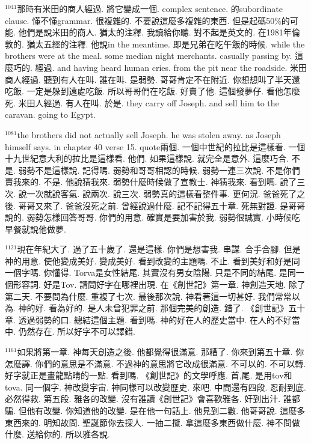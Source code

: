 \documentclass{book}
\begin{document}
$^{1041}$那時有米田的商人經過.
將它變成一個.
complex sentence.
的subordinate clause.
懂不懂grammar.
很複雜的.
不要說這麼多複雜的東西.
但是起碼50\%的可能.
他們是說米田的商人.
猶太的注釋.
我讀給你聽.
對不起是英文的.
在1981年倫敦的.
猶太五經的注釋.
他說in the meantime.
即是兄弟在吃午飯的時候.
while the brothers were at the meal.
some median night merchants.
casually passing by.
這麼巧的.
經過.
and having heard human cries.
from the pit near the roadside.
米田商人經過.
聽到有人在叫.
誰在叫.
是弱勢.
哥哥肯定不在附近.
你想想叫了半天還吃飯.
一定是躲到遠處吃飯.
所以哥哥們在吃飯.
好賣了他.
這個發夢仔.
看他怎麼死.
米田人經過.
有人在叫.
於是.
they carry off Joseph.
and sell him to the caravan.
going to Egypt.

$^{1081}$the brothers did not actually sell Joseph.
he was stolen away.
as Joseph himself says.
in chapter 40 verse 15.
quote兩個.
一個中世紀的拉比是這樣看.
一個十九世紀意大利的拉比是這樣看.
他們.
如果這樣說.
就完全是意外.
這麼巧合.
不是.
弱勢不是這樣說.
記得嗎.
弱勢和哥哥相認的時候.
弱勢一連三次說.
不是你們賣我來的.
不是.
他說猜我來.
弱勢什麼時候做了宣教士.
神猜我來.
看到嗎.
說了三次.
說一次就說客氣.
說兩次.
說三次.
弱勢真的這樣看整件事.
更何況.
爸爸死了之後.
哥哥又來了.
爸爸沒死之前.
曾經說過什麼.
記不記得五十章.
死無對證.
是哥哥說的.
弱勢怎樣回答哥哥.
你們的用意.
確實是要加害於我.
弱勢很誠實.
小時候吃早餐就說他做夢.

$^{1121}$現在年紀大了.
過了五十歲了.
還是這樣.
你們是想害我.
串謀.
合手合腳.
但是神的用意.
使他變成美好.
變成美好.
看到改變的主題嗎.
不止.
看到美好和好是同一個字嗎.
你懂得.
Torva是女性結尾.
其實沒有男女陰陽.
只是不同的結尾.
是同一個形容詞.
好是Tov.
請問好字在哪裡出現.
在《創世記》第一章.
神創造天地.
除了第二天.
不要問為什麼.
重複了七次.
最後那次說.
神看著這一切甚好.
我們常常以為.
神的好.
看為好的.
是人未曾犯罪之前.
那個完美的創造.
錯了.
《創世記》五十章.
透過弱勢的口.
總結這個主題.
看到嗎.
神的好在人的歷史當中.
在人的不好當中.
仍然存在.
所以好字不可以譯錯.

$^{1161}$如果將第一章.
神每天創造之後.
他都覺得很滿意.
那糟了.
你來到第五十章.
你怎麼譯.
你們的意思是不滿意.
不過神的意思將它改成很滿意.
不可以的.
不可以轉.
好字就正是畫龍點睛的一點.
看到嗎.
《創世記》的文學呼應.
首,尾.
是用tov和tova.
同一個字.
神改變宇宙.
神同樣可以改變歷史.
來吧.
中間還有四段.
忍耐到底.
必然得救.
第五段.
雅各的改變.
沒有誰讀《創世記》會喜歡雅各.
奸到出汁.
誰都騙.
但他有改變.
你知道他的改變.
是在他一句話上.
他見到二數.
他哥哥說.
這麼多東西來的.
明知故問.
聖誕節你去探人.
一抽二攬.
拿這麼多東西做什麼.
神不問做什麼.
送給你的.
所以雅各說.
\end{document}
